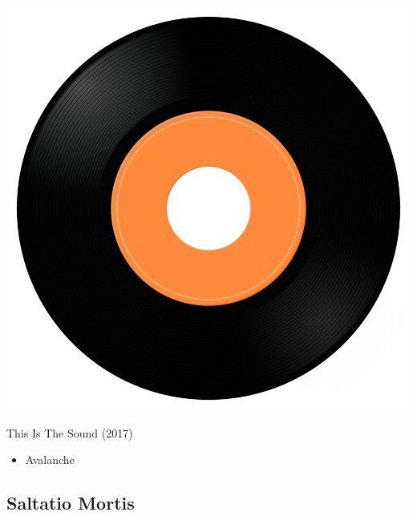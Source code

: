 \begin{minipage}[t]{0.25\textwidth}\vspace{0pt}
\captionsetup{type=figure}
\includegraphics[width=\textwidth]{Images/cover.png}
\caption*{This Is The Sound (2017)}
\end{minipage}
\begin{minipage}[t]{0.25\textwidth}\vspace{0pt}
\begin{itemize}[nosep,leftmargin=1em,labelwidth=*,align=left]
	\setlength{\itemsep}{0pt}
	\item Avalanche
\end{itemize}
\end{minipage}

\subsection{Saltatio Mortis}

